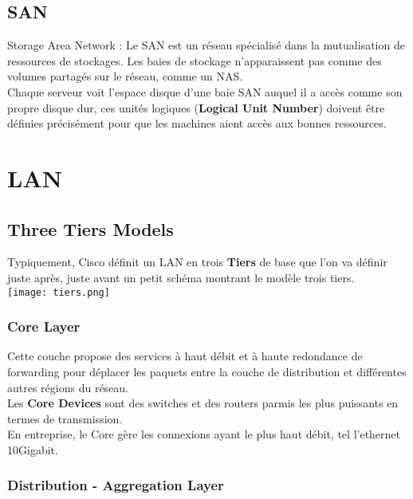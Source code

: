 \documentclass{report}
\begin{document}
		\subsection{SAN}

			Storage Area Network : Le SAN est un réseau spécialisé dans la mutualisation de ressources de stockages. Les baies de stockage n'apparaissent pas comme des volumes partagés sur le réseau, comme un NAS.\\
			Chaque serveur voit l'espace disque d'une baie SAN auquel il a accès comme son propre disque dur, ces unités logiques (\textbf{Logical Unit Number}) doivent être définies précisément pour que les machines aient accès aux bonnes ressources.\\

	\section{LAN}

		\subsection{Three Tiers Models}

		Typiquement, Cisco définit un LAN en trois \textbf{Tiers} de base que l'on va définir juste après, juste avant un petit schéma montrant le modèle trois tiers. \\

		\texttt{[image: tiers.png]}

			\subsubsection{Core Layer}

				Cette couche propose des services à haut débit et à haute redondance de forwarding pour déplacer les paquets entre la couche de distribution et différentes autres régions du réseau.\\

				Les \textbf{Core Devices} sont des switches et des routers parmis les plus puissants en termes de transmission.\\

				En entreprise, le Core gère les connexions ayant le plus haut débit, tel l'ethernet 10Gigabit.\\

			\subsubsection{Distribution - Aggregation Layer}
\end{document}
